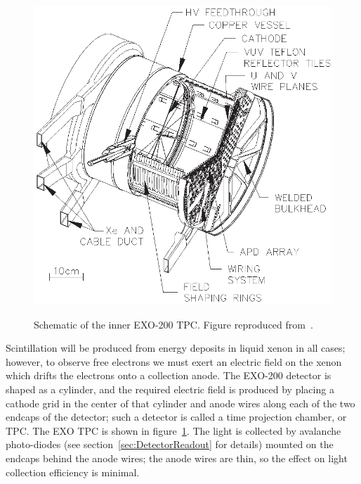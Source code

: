 \begin{figure}
\begin{center}
\includegraphics[keepaspectratio=true,width=\textwidth]{TPCSchematic.eps}
\end{center}
\renewcommand{\baselinestretch}{1}
\small\normalsize
\begin{quote}
\caption{Schematic of the inner EXO-200 TPC.  Figure reproduced from~\cite{detectorPartI}.}
\label{fig:TPCSchematic}
\end{quote}
\end{figure}
\renewcommand{\baselinestretch}{2}
\small\normalsize

Scintillation will be produced from energy deposits in liquid xenon in all cases;~\cite{Thesis_EDahl} however, to observe free electrons we must exert an electric field on the xenon which drifts the electrons onto a collection anode.  The EXO-200 detector is shaped as a cylinder, and the required electric field is produced by placing a cathode grid in the center of that cylinder and anode wires along each of the two endcaps of the detector; such a detector is called a time projection chamber, or TPC.  The EXO TPC is shown in figure~\ref{fig:TPCSchematic}.  The light is collected by avalanche photo-diodes (see section~\ref{sec:DetectorReadout} for details) mounted on the endcaps behind the anode wires; the anode wires are thin, so the effect on light collection efficiency is minimal.

